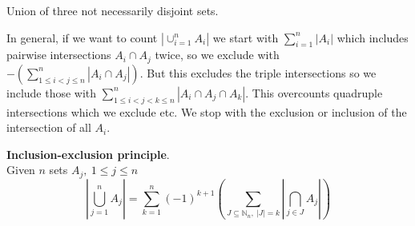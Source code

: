 \def\firstcircle{(0,0) circle (1.5cm)}
\def\secondcircle{(60:2cm) circle (1.5cm)}
\def\thirdcircle{(0:2cm) circle (1.5cm)}

\begin{marginfigure}[1.0in]
\caption{Union of three not necessarily disjoint sets.}
\label{fig:union3sets}
\end{marginfigure}

In general, if we want to count $|\cup_{i = 1}^n A_i|$ we start with $\sum_{i = 1}^n |A_i|$ which includes pairwise intersections $A_i \cap A_j$ twice, so we exclude  with $ - (\sum_{1 \leq i < j \leq n}^n |A_i \cap A_j|)$. But this excludes the triple intersections so we include those with $\sum_{1 \leq i < j < k \leq n}^n |A_i \cap A_j \cap A_k|$. This overcounts quadruple intersections which we exclude etc. We stop with the exclusion or inclusion of the intersection of all $A_i$.

\begin{thm}\label{inclusionExclusion}
\textbf{Inclusion-exclusion principle}.\\
Given $n$ sets $A_j,\ 1 \leq j \leq n$
$$
|\bigcup_{j = 1}^n A_j| = \sum_{k = 1}^n (-1)^{k + 1} (\sum_{J \subseteq \mathbb{N}_n,\ |J|=k} |\bigcap_{j\in J} A_j|)
$$	
\end{thm}

